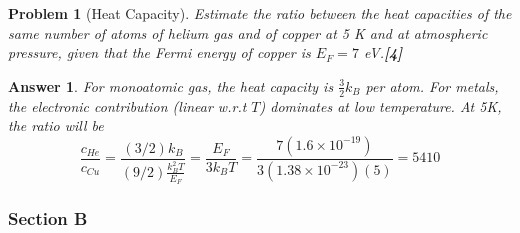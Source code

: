 \documentclass[a4paper]{article}
\newtheorem{ans}{Answer}[subsection]
\theoremstyle{new}
\newtheorem{qns}{Problem}[subsection]
\begin{document}
\begin{qns}[Heat Capacity]
Estimate the ratio between the heat capacities of the same number of atoms of helium gas and of copper at 5 K and at atmospheric pressure, given that the Fermi energy of copper is $E_F = 7$ eV.\hfill\textbf{[4]}
\end{qns}
\begin{ans}
For monoatomic gas, the heat capacity is $\frac{3}{2}k_B$ per atom. For metals, the electronic contribution (linear w.r.t $T$) dominates at low temperature. At 5K, the ratio will be
$$\frac{c_{He}}{c_{Cu}}=\frac{(3/2)k_B}{(9/2)\frac{k_B^2T}{E_F}}=\frac{E_F}{3k_BT}=\frac{7(1.6\times10^{-19})}{3(1.38\times10^{-23})(5)}=5410$$
\end{ans}
\subsubsection{Section B}
\end{document}
